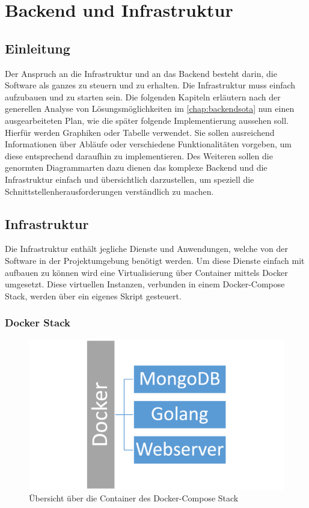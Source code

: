 
\section{Backend und Infrastruktur}
\subsection{Einleitung}
Der Anspruch an die Infrastruktur und an das Backend besteht darin, die Software als ganzes zu steuern und zu erhalten. Die Infrastruktur muss einfach aufzubauen und zu starten sein. Die folgenden Kapiteln erläutern nach der generellen Analyse von Lösungsmöglichkeiten im \autoref{chap:backendsota} nun einen ausgearbeiteten Plan, wie die später folgende Implementierung aussehen soll. Hierfür werden Graphiken oder Tabelle verwendet. Sie sollen ausreichend Informationen über Abläufe oder verschiedene Funktionalitäten vorgeben, um diese entsprechend daraufhin zu implementieren. Des Weiteren sollen die genormten Diagrammarten dazu dienen das komplexe Backend und die Infrastruktur einfach und übersichtlich darzustellen, um speziell die Schnittstellenherausforderungen verständlich zu machen.
\subsection{Infrastruktur}
Die Infrastruktur enthält jegliche Dienste und Anwendungen, welche von der Software in der Projektumgebung benötigt werden. Um diese Dienste einfach mit aufbauen zu können wird eine Virtualisierung über Container mittels Docker umgesetzt. Diese virtuellen Instanzen, verbunden in einem Docker-Compose Stack, werden über ein eigenes Skript gesteuert.
\subsubsection{Docker Stack}
\begin{figure}[H]
	\centering
	\includegraphics[width=\linewidth]{images/mbeier_konzept/docker-stack}
	\caption[Docker-Compose Stack]{Übersicht über die Container des Docker-Compose Stack}
	\label{fig:docker-stack}
\end{figure}

